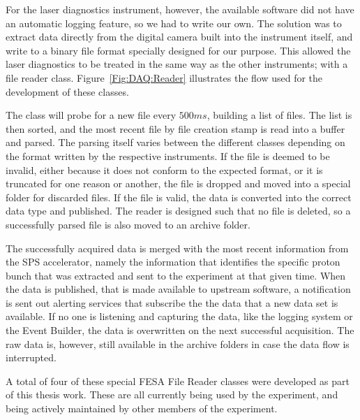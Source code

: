 For the laser diagnostics instrument, however, the available software did not have an automatic logging feature, so we had to write our own.
The solution was to extract data directly from the digital camera built into the instrument itself, and write to a binary file format specially designed for our purpose.
This allowed the laser diagnostics to be treated in the same way as the other instruments; with a file reader class.
Figure~\ref{Fig:DAQ:Reader} illustrates the flow used for the development of these classes.

The class will probe for a new file every $500\unit{ms}$, building a list of files.
The list is then sorted, and the most recent file by file creation stamp is read into a buffer and parsed.
The parsing itself varies between the different classes depending on the format written by the respective instruments.
If the file is deemed to be invalid, either because it does not conform to the expected format, or it is truncated for one reason or another, the file is dropped and moved into a special folder for discarded files.
If the file is valid, the data is converted into the correct data type and published.
The reader is designed such that no file is deleted, so a successfully parsed file is also moved to an archive folder.

The successfully acquired data is merged with the most recent information from the SPS accelerator, namely the information that identifies the specific proton bunch that was extracted and sent to the experiment at that given time.
When the data is published, that is made available to upstream software, a notification is sent out alerting services that subscribe the the data that a new data set is available.
If no one is listening and capturing the data, like the logging system or the Event Builder, the data is overwritten on the next successful acquisition.
The raw data is, however, still available in the archive folders in case the data flow is interrupted.

A total of four of these special FESA File Reader classes were developed as part of this thesis work.
These are all currently being used by the experiment, and being actively maintained by other members of the experiment.

